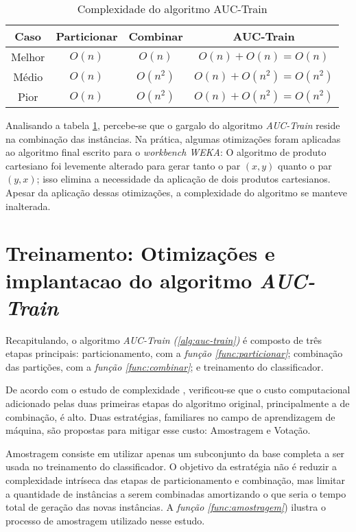 \begin{table}[h]
    \centering
    \begin{tabular}{ c | c c | c }
        \hline

        Caso & Particionar & Combinar & AUC-Train \\

        \hline

        Melhor & $O(n)$ & $O(n)$ & $O(n) + O(n) = O(n)$ \\
        Médio & $O(n)$ & $O(n^2)$ & $O(n) + O(n^2) = O(n^2)$ \\
        Pior  & $O(n)$ & $O(n^2)$ & $O(n) + O(n^2) = O(n^2)$ \\

        \hline
    \end{tabular}

    \caption{Complexidade do algoritmo AUC-Train}
    \label{auc-train-complexity}
\end{table}

Analisando a tabela \ref{auc-train-complexity}, percebe-se que o gargalo do algoritmo \emph{AUC-Train} reside na combinação das instâncias. Na prática, algumas otimizações foram aplicadas ao algoritmo final escrito para o \emph{workbench WEKA}:
O algoritmo de produto cartesiano foi levemente alterado para gerar tanto o par $(x, y)$ quanto o par $(y, x)$; isso elimina a necessidade da aplicação de dois produtos cartesianos. Apesar da aplicação dessas otimizações, a complexidade do algoritmo se manteve inalterada.


\section{Treinamento: Otimizações e implantacao do algoritmo \emph{AUC-Train}}

Recapitulando, o algoritmo \emph{AUC-Train (\ref{alg:auc-train})} é composto de três etapas principais: particionamento, com a \emph{função \ref{func:particionar}}; combinação das partições, com a \emph{função \ref{func:combinar}}; e treinamento do classificador.

De acordo com o estudo de complexidade , verificou-se que o custo computacional adicionado pelas duas primeiras etapas do algoritmo  original, principalmente a de combinação, é alto. Duas estratégias, familiares no campo de aprendizagem de máquina, são propostas para mitigar esse custo: Amostragem e Votação.

Amostragem consiste em utilizar apenas um subconjunto da base completa a ser usada no treinamento do classificador. O objetivo da estratégia não é reduzir a complexidade intríseca das etapas de particionamento e combinação, mas limitar a quantidade de instâncias a serem combinadas amortizando o que seria o tempo total de geração das novas instâncias. A \emph{função \ref{func:amostragem}}) ilustra o processo de amostragem utilizado nesse estudo.

